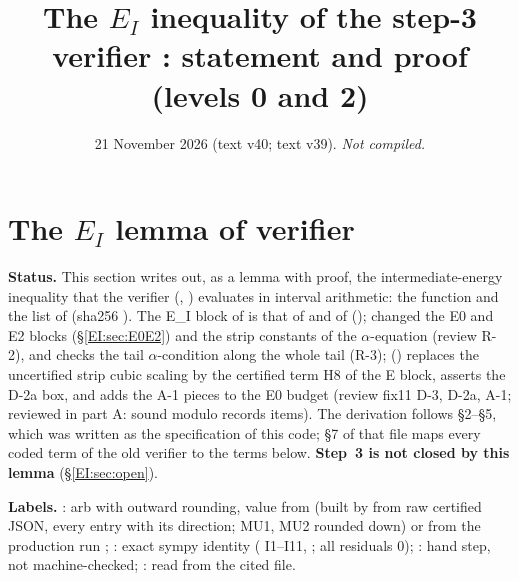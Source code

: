 \documentclass[11pt]{article}
\title{The $E_I$ inequality of the step-3 verifier \fn{fin13v4c}: statement and proof (levels 0 and 2)}
\author{}\date{21 November 2026 (text v40; text v39). \emph{Not compiled.}}
\begin{document}
\maketitle
\fi
\providecommand{\Dv}{\mathcal D_V}

\section{The $E_I$ lemma of verifier }\label{EI:sec}
\noindent\textbf{Status.} This section writes out, as a lemma with proof, the intermediate-energy inequality that the verifier  (, ) evaluates in interval arithmetic: the function  and the list  of  (sha256 ). The E\_I block of  is that of  and of  ();  changed the E0 and E2 blocks (\S\ref{EI:sec:E0E2}) and the strip constants of the $\alpha$-equation (review R-2), and checks the tail $\alpha$-condition along the whole tail (R-3);  () replaces the uncertified strip cubic scaling  by the certified term H8 of the E block, asserts the D-2a box, and adds the A-1 pieces to the E0 budget (review fix11 D-3, D-2a, A-1; reviewed in  part A: sound modulo records items). The derivation follows  \S2--\S5, which was written as the specification of this code; \S7 of that file maps every coded term of the old verifier  to the terms below. \textbf{Step~3 is not closed by this lemma} (\S\ref{EI:sec:open}).

\noindent\textbf{Labels.} \tC: arb with outward rounding, value from  (built by  from raw certified JSON, every entry with its direction; MU1, MU2 rounded down) or from the production run ; \tS: exact sympy identity ( I1--I11, ; all residuals 0); \tHd: hand step, not machine-checked; \tR: read from the cited file.
\end{document}
